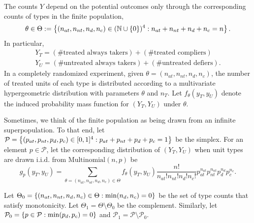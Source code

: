 \documentclass[12pt,reqno]{amsart}
\theoremstyle{theorem}
\theoremstyle{definition}
\newcommand{\0}{\mathbf{0}}
\newcommand{\1}{\mathbf{1}}
\begin{document}
 The counts $Y$ depend on the potential outcomes only through
the
corresponding counts of types in the finite population, \[\theta \in \Theta :=   \left\{{(n_{at}, n_{nt}, n_d, n_c) \in (
\mathbb{N}\cup
\left\{{0}\right\})^4 : n_ {at} + n_{nt} + n_d + n_c
 = n}\right\}.
 \]
 In particular,
 \begin{align*}
 Y_T = (\text{\# treated always takers}) + (\text{\# treated compliers}) \\ 
 Y_U = (\text{\# untreated always takers}) + (\text{\# untreated defiers}).
 \end{align*}
 In a completely randomized experiment, given $\theta = (n_
 {at}, n_{nt}, n_d, n_c)$, the number of treated
 units of each type is distributed according to a multivariate hypergeometric
 distribution with parameters $\theta$ and $n_T$. Let $f_\theta(y_T, y_U)$ denote the induced
 probability mass function for $(Y_T, Y_U)$ under $\theta$. 

Sometimes, we think of the finite population as being drawn from an infinite
superpopulation. To that end, let $\mathcal P = \left\{{(p_{at}, p_{nt}, p_d, p_c) \in [0,1]^4
: p_{at} +  p_{nt} +  p_d +  p_c = 1}\right\}$ be the simplex. For an element $p \in \mathcal P$,
let the corresponding distribution of $(Y_T, Y_U)$ when unit types are drawn i.i.d. from
$\mathrm{Multinomial}(n, p)$ be \[
g_p(y_T, y_U) = \sum_{\theta = (n_{at}, n_{nt}, n_d, n_c) \in \Theta} f_\theta (y_T, y_U)
 \frac{n!}{n_{at}! n_{nt}! n_d ! n_c!} p_{at}^{n_{at}} p_{nt}^{n_{nt}} p_d^{n_d} p_c^{n_c}.
\]


Let $\Theta_0 = \left\{{(n_{at}, n_{nt}, n_d, n_c)  \in \Theta: \min(n_d, n_c) = 0}\right\}$ be the
set of type counts that satisfy monotonicity. Let
$\Theta_1 = \Theta \setminus \Theta_0$ be the complement. Similarly, let $\mathcal P_0 =
\left\{{p \in \mathcal P: \min(p_d, p_c) = 0}\right\}$ and $\mathcal P_1 = \mathcal P \setminus
\mathcal P_0$. 
\end{document}
